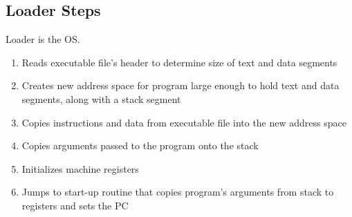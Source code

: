 \subsection{Loader Steps}
Loader is the OS.
\begin{enumerate}
    \item Reads executable file’s header to determine size of text and data segments
    \item Creates new address space for program large enough to hold text and data segments, along with a stack segment
    \item Copies instructions and data from executable file into the new address space
    \item Copies arguments passed to the program onto the stack
    \item Initializes machine registers
    \item Jumps to start-up routine that copies program’s arguments from stack to registers and sets the PC
\end{enumerate}